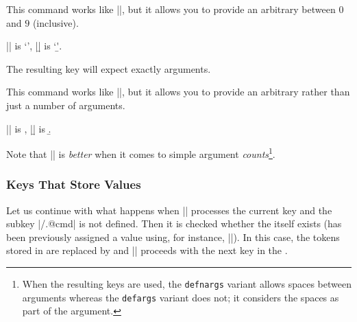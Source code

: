 \begin{command}{\pgfkeysdefnargs{}}
  This command works like |\pgfkeysdef|, but it allows you to provide
  an arbitrary  between $0$ and $9$ (inclusive).

\begin{codeexample}[]

|\a| is `\a', |\b| is `\b'.
\end{codeexample}
	The resulting key will expect exactly  arguments.
\end{command}

\begin{command}{\pgfkeysdefargs{}}
  This command works like |\pgfkeysdefnargs|, but it allows you to provide
  an arbitrary  rather than just a number of arguments.

\begin{codeexample}[]

|\a| is \a, |\b| is \b.
\end{codeexample}
	Note that |\pgfkeysdefnargs| is \emph{better} when it comes to simple argument \emph{counts}\footnote{When the resulting keys are used, the \texttt{defnargs} variant allows spaces between arguments whereas the \texttt{defargs} variant does not; it considers the spaces as part of the argument.}.
\end{command}



\subsubsection{Keys That Store Values}

Let us continue with what happens when |\pgfkeys| processes the
current key and  the subkey |/.@cmd| is not defined. Then
it is checked whether the  itself exists (has been
previously assigned a value using, for instance,
|\pgfkeyssetvalue|). In this case, the tokens stored in  are
replaced by  and |\pgfkeys| proceeds with the next key in
the .


